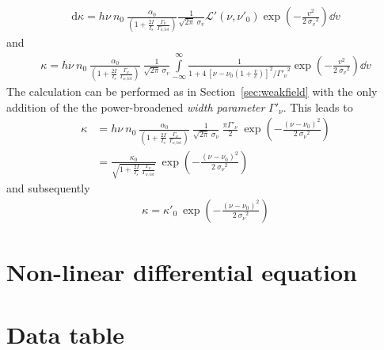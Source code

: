 \begin{align}
    \mathrm{d}\kappa = 
    h\nu~n_0~\frac{\alpha_0}{(1 + \frac{2I}{I_s}~\frac{\Gamma_\nu}{\Gamma_{\nu,tot}})} 
    \frac{1}{\sqrt{2\pi}~\sigma_v} \mathcal{L}'(\nu,\nu'_0) 
    \exp{ \left( -\frac{v^2}{2~{\sigma_v}^2} \right ) } \dd v
\end{align}
and
\begin{align}
    \kappa = h\nu~n_0~\frac{\alpha_0}{(1 + \frac{2I}{I_s}~\frac{\Gamma_\nu}{\Gamma_{\nu,tot}})}~ 
    \frac{1}{\sqrt{2\pi}~\sigma_v} 
    \int\limits_{-\infty}^{\infty} 
    \frac{1}{ 1+4~{\left [\nu-\nu_0\left ( 1 + \frac{v}{c} \right) \right] }^2 / {\Gamma'_\nu}^2 } 
    \exp{ \left (-\frac{v^2}{ 2~{\sigma_v}^2 }\right ) } \dd v
\end{align}
The calculation can be performed as in Section~\ref{sec:weakfield} with the only 
addition of the the power-broadened \textit{width parameter} \(\Gamma'_\nu \). 
This leads to
\begin{align}
    \kappa &= h\nu~n_0~
    \frac{\alpha_0}{(1 + \frac{2I}{I_s}~\frac{\Gamma_\nu}{\Gamma_{\nu,tot}})}~ 
    \frac{1}{\sqrt{2\pi}~\sigma_\nu}~\frac{\pi \Gamma'_\nu}{2}~
    \exp{ \left ( -\frac{{(\nu - \nu_0)}^2 }{2~{\sigma_\nu}^2 } \right )} \nonumber \\
    &= \frac{\kappa_0}{\sqrt{1 + \frac{2I}{I_s}~\frac{\Gamma_\nu}{\Gamma_{\nu,tot}}}}~
    \exp{ \left ( -\frac{{(\nu - \nu_0)}^2 }{2~{\sigma_\nu}^2 } \right )}
\end{align}
and subsequently
\begin{align}
    \kappa = \kappa'_0~\exp{ \left ( -\frac{{(\nu - \nu_0)}^2 }{2~{\sigma_\nu}^2 } \right )} \label{eq:kappa_general}
\end{align}

\pagebreak
\section{Non-linear differential equation}  %

\pagebreak

\section{Data table}

